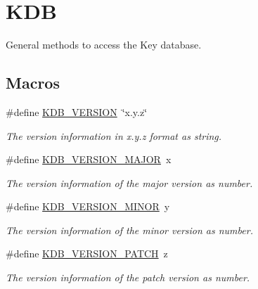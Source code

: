 \hypertarget{group__kdb}{}\section{K\+DB}
\label{group__kdb}


General methods to access the Key database.  


\subsection*{Macros}
\begin{DoxyCompactItemize}
\item 
\#define \hyperlink{group__kdb_ga2f8953fe5f9f28db54b3ef678ebf40d7}{K\+D\+B\+\_\+\+V\+E\+R\+S\+I\+ON}~\char`\"{}x.\+y.\+z\char`\"{}
\begin{DoxyCompactList}\small\item\em The version information in x.\+y.\+z format as string. \end{DoxyCompactList}\item 
\#define \hyperlink{group__kdb_ga57ee4c9e19daac86934e62441f8755fc}{K\+D\+B\+\_\+\+V\+E\+R\+S\+I\+O\+N\+\_\+\+M\+A\+J\+OR}~x
\begin{DoxyCompactList}\small\item\em The version information of the major version as number. \end{DoxyCompactList}\item 
\#define \hyperlink{group__kdb_ga3407dacaacc5d83e2046db872b2408a9}{K\+D\+B\+\_\+\+V\+E\+R\+S\+I\+O\+N\+\_\+\+M\+I\+N\+OR}~y
\begin{DoxyCompactList}\small\item\em The version information of the minor version as number. \end{DoxyCompactList}\item 
\#define \hyperlink{group__kdb_gaa67fb397397981929b24f52ed2a2d92d}{K\+D\+B\+\_\+\+V\+E\+R\+S\+I\+O\+N\+\_\+\+P\+A\+T\+CH}~z
\begin{DoxyCompactList}\small\item\em The version information of the patch version as number. \end{DoxyCompactList}\end{DoxyCompactItemize}
